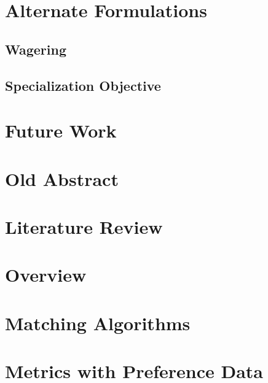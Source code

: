 \documentclass{article}
\begin{document}
\section{Alternate Formulations}

\subsection{Wagering}

\subsection{Specialization Objective}

\section{Future Work}

\newpage

\appendix
\appendixpage
\addappheadtotoc

\section{Old Abstract}



\section{Literature Review}



\section{Overview}



\section{Matching Algorithms}
\label{Matching}







\section{Metrics with Preference Data}
\label{Metrics}
\end{document}
